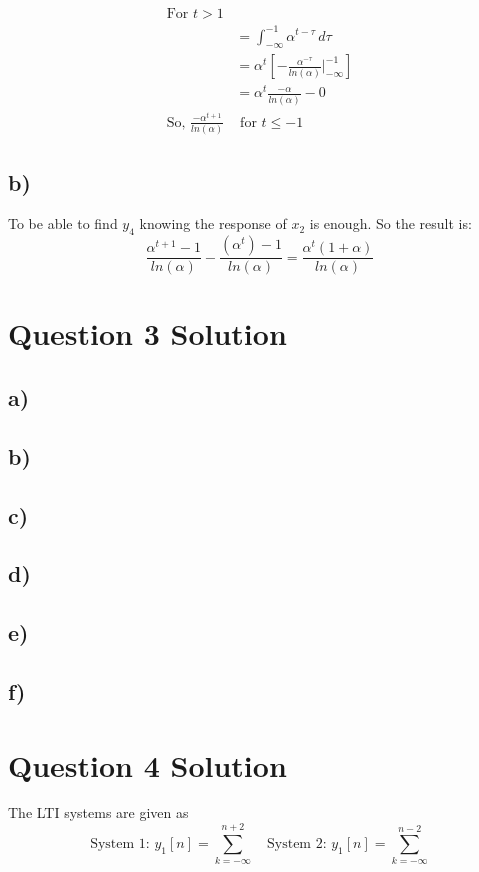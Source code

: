 \documentclass[letterpaper,12pt]{article}
\begin{document}
\begin{equation}
    \begin{split}
        \text{For }t > 1&  \\
        &=   \int_{-\infty}^{-1} \alpha^{t-\tau}  \,d\tau \\
        &= \alpha^t [- \frac{\alpha^{-\tau}}{ln(\alpha)} |_{-\infty}^{-1}]\\
        &= \alpha^t \frac{-\alpha}{ln(\alpha) } - 0\\
        \text{So, } \frac{-\alpha^{t+1}}{ln(\alpha)} &\text{ for } t \leq -1 
    \end{split}
\end{equation}


\subsection{b)}
To be able to find \(y_4\) knowing the response of \(x_2\) is enough. So the result is:
\[
\frac{\alpha^{t+1}-1}{ln(\alpha)} - \frac{(\alpha^t)-1}{ln(\alpha)} = \frac{\alpha^t(1+\alpha)}{ln(\alpha)}    
\]
\section{Question 3 Solution}
\subsection{a)}
\subsection{b)}
\subsection{c)}
\subsection{d)}
\subsection{e)}
\subsection{f)}

\section{Question 4 Solution}
The LTI systems are given as 
\[
\text{System 1: }    y_1[n] = \sum_{k = -\infty}^{n +2} \quad  \text{System 2: }    y_1[n] = \sum_{k = -\infty}^{n-2}  
\]
\end{document}
